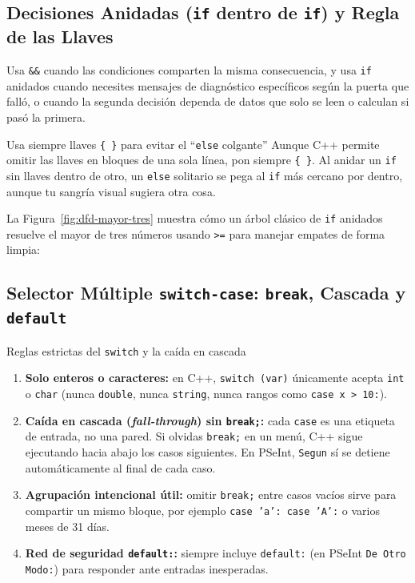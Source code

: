 \documentclass[11pt,letterpaper]{article}
\begin{document}
\subsection{Decisiones Anidadas (\texorpdfstring{\texttt{if}}{if} dentro de \texorpdfstring{\texttt{if}}{if}) y Regla de las Llaves}

Usa \texttt{\&\&} cuando las condiciones comparten la misma consecuencia, y usa \texttt{if} anidados cuando necesites mensajes de diagnóstico específicos según la puerta que falló, o cuando la segunda decisión dependa de datos que solo se leen o calculan si pasó la primera.

\begin{consejo}{Usa siempre llaves \texttt{\{ \}} para evitar el ``\texttt{else} colgante''}
Aunque C++ permite omitir las llaves en bloques de una sola línea, pon siempre \texttt{\{ \}}. Al anidar un \texttt{if} sin llaves dentro de otro, un \texttt{else} solitario se pega al \texttt{if} más cercano por dentro, aunque tu sangría visual sugiera otra cosa.
\end{consejo}

La Figura~\ref{fig:dfd-mayor-tres} muestra cómo un árbol clásico de \texttt{if} anidados resuelve el mayor de tres números usando \texttt{>=} para manejar empates de forma limpia:


\subsection{Selector Múltiple \texorpdfstring{\texttt{switch-case}}{switch-case}: \texorpdfstring{\texttt{break}}{break}, Cascada y \texorpdfstring{\texttt{default}}{default}}

\begin{peligro}{Reglas estrictas del \texttt{switch} y la caída en cascada}
\begin{enumerate}
  \item \textbf{Solo enteros o caracteres:} en C++, \texttt{switch (var)} únicamente acepta \texttt{int} o \texttt{char} (nunca \texttt{double}, nunca \texttt{string}, nunca rangos como \texttt{case x > 10:}).
  \item \textbf{Caída en cascada (\textit{fall-through}) sin \texttt{break;}:} cada \texttt{case} es una etiqueta de entrada, no una pared. Si olvidas \texttt{break;} en un menú, C++ sigue ejecutando hacia abajo los casos siguientes. En PSeInt, \texttt{Segun} sí se detiene automáticamente al final de cada caso.
  \item \textbf{Agrupación intencional útil:} omitir \texttt{break;} entre casos vacíos sirve para compartir un mismo bloque, por ejemplo \texttt{case 'a': case 'A':} o varios meses de 31 días.
  \item \textbf{Red de seguridad \texttt{default:}:} siempre incluye \texttt{default:} (en PSeInt \texttt{De Otro Modo:}) para responder ante entradas inesperadas.
\end{enumerate}
\end{peligro}
\end{document}
